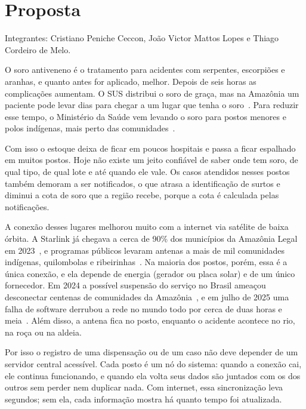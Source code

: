 \documentclass[a4paper,12pt]{article}
\begin{document}
\iniciarPreTextual
\fazcapa
\fazfolhaderosto

\iniciarTextual

\section{Proposta}
\label{sec:resumo}

Integrantes: Cristiano Peniche Ceccon, João Victor Mattos Lopes e Thiago
Cordeiro de Melo.

O soro antiveneno é o tratamento para acidentes com serpentes, escorpiões e
aranhas, e quanto antes for aplicado, melhor. Depois de seis horas as
complicações aumentam. O SUS distribui o soro de graça, mas na Amazônia um
paciente pode levar dias para chegar a um lugar que tenha o
soro~\cite{monteiro2020}. Para reduzir esse tempo, o Ministério da Saúde vem
levando o soro para postos menores e polos indígenas, mais perto das
comunidades~\cite{nt127,farias2025}.

Com isso o estoque deixa de ficar em poucos hospitais e passa a ficar
espalhado em muitos postos. Hoje não existe um
jeito confiável de saber onde tem soro, de qual tipo, de qual lote e até
quando ele vale. Os casos atendidos nesses postos também demoram a ser
notificados, o que atrasa a identificação de surtos e diminui a cota de soro
que a região recebe, porque a cota é calculada pelas notificações.

A conexão desses lugares melhorou muito com a internet via satélite de baixa
órbita. A Starlink já chegava a cerca de 90\% dos municípios da Amazônia Legal
em 2023~\cite{olhar2023}, e programas públicos levaram antenas a mais de mil
comunidades indígenas, quilombolas e ribeirinhas~\cite{olhar2024}. Na maioria
dos postos, porém, essa é a única conexão, e ela depende de energia (gerador
ou placa solar) e de um único fornecedor. Em 2024 a possível suspensão do
serviço no Brasil ameaçou desconectar centenas de comunidades da
Amazônia~\cite{teletime2024}, e em julho de 2025 uma falha de software derrubou
a rede no mundo todo por cerca de duas horas e meia~\cite{starlink2025}. Além
disso, a antena fica no posto, enquanto o acidente acontece no rio, na roça ou
na aldeia.

Por isso o registro de uma dispensação ou de um caso não deve depender de um
servidor central acessível. Cada posto é um nó do sistema: quando a conexão
cai, ele continua funcionando, e quando ela volta seus dados são juntados com
os dos outros sem perder nem duplicar nada. Com internet, essa sincronização
leva segundos; sem ela, cada informação mostra há quanto tempo foi
atualizada.
\end{document}
